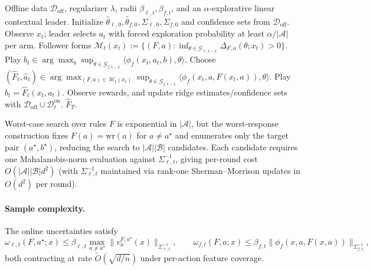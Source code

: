 \documentclass{article}
\newcommand{\cA}{\mathcal{A}}
\newcommand{\cB}{\mathcal{B}}
\newcommand{\cG}{\mathcal{G}}
\newcommand{\cD}{\mathcal{D}}
\newcommand{\cM}{\mathcal{M}}
\begin{document}
\begin{algorithm}[t]
\caption{Contextual Hybrid-FMUCB (linear)}
\label{alg:contextual-hybrid-fmucb}
\begin{algorithmic}[1]
\Require Offline data $\cD_{\mathrm{off}}$, regularizer $\lambda$, radii $\beta_{\ell,t},\beta_{f,t}$, and an $\alpha$-explorative linear contextual leader.
\State Initialize $\hat\theta_{\ell,0},\hat\theta_{f,0},\Sigma_{\ell,0},\Sigma_{f,0}$ and confidence sets from $\cD_{\mathrm{off}}$.
    \State Observe $x_t$; leader selects $a_t$ with forced exploration probability at least $\alpha/|\cA|$ per arm.
    \State Follower forms $\cM_t(x_t):=\{(F,a):\inf_{\theta\in\cG_{\ell,t-1}}\Delta_{F,a}(\theta;x_t)>0\}$.
    \If{$\cM_t(x_t)=\emptyset$} 
        \State Play $b_t\in\arg\max_{b}\sup_{\theta\in\cG_{f,t-1}}\langle\phi_f(x_t,a_t,b),\theta\rangle$.
    \Else
        \State Choose $(\hat F_t,\hat a_t)\in\arg\max_{(F,a)\in\cM_t(x_t)}\sup_{\theta\in\cG_{f,t-1}}\langle\phi_f(x_t,a,F(x_t,a)),\theta\rangle$.
        \State Play $b_t=\hat F_t(x_t,a_t)$.
    \EndIf
    \State Observe rewards, and update ridge estimates/confidence sets with $\cD_{\mathrm{off}}\cup\cD_t^{\mathrm{on}}$.
\EndFor
\State \Return $\hat F_T$.
\end{algorithmic}
\end{algorithm}

Worst-case search over rules $F$ is exponential in $|\cA|$, but the worst-response construction fixes $F(a)=\mathrm{wr}(a)$ for $a\neq a^\star$ and enumerates only the target pair $(a^\star,b^\star)$, reducing the search to $|\cA||\cB|$ candidates. Each candidate requires one Mahalanobis-norm evaluation against $\Sigma_{\ell,t}^{-1}$, giving per-round cost $O(|\cA||\cB|d^2)$ (with $\Sigma_{\ell,t}^{-1}$ maintained via rank-one Sherman--Morrison updates in $O(d^2)$ per round).

\paragraph{Sample complexity.}
The online uncertainties satisfy
\[
    \omega_{\ell,t}(F,a^\star;x)\le \beta_{\ell,t}\max_{a\neq a^\star}\|v_a^{F,a^\star}(x)\|_{\Sigma_{\ell,t}^{-1}},
    \qquad
    \omega_{f,t}(F,a;x)\le \beta_{f,t}\|\phi_f(x,a,F(x,a))\|_{\Sigma_{f,t}^{-1}},
\]
both contracting at rate $\widetilde O(\sqrt{d/n})$ under per-action feature coverage.
\end{document}
